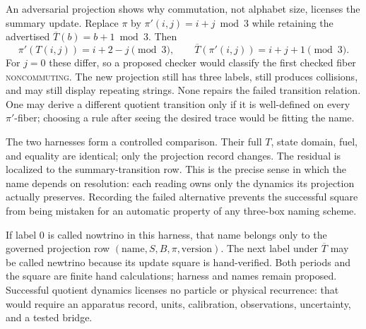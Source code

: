 An adversarial projection shows why commutation, not alphabet size, licenses the summary update.  Replace \(\pi\) by
\(\pi'(i,j)=i+j\bmod3\) while retaining the advertised \(\overline T(b)=b+1\bmod3\).  Then
\[
 \pi'(T(i,j))=i+2-j\pmod3,\qquad
 \overline T(\pi'(i,j))=i+j+1\pmod3.
\]
For \(j=0\) these differ, so a proposed checker would classify the first checked fiber
\textsc{noncommuting}.  The new projection
still has three labels, still produces collisions, and may still display repeating strings.  None repairs the failed
transition relation.  One may derive a different quotient transition only if it is well-defined on every
\(\pi'\)-fiber; choosing a rule after seeing the desired trace would be fitting the name.

The two harnesses form a controlled comparison.  Their full \(T\), state domain, fuel, and equality are identical;
only the projection record changes.  The residual is localized to the summary-transition row.  This is the precise
sense in which the name depends on resolution: each reading owns only the dynamics its projection actually preserves.
Recording the failed alternative prevents the successful square from being mistaken for an automatic property of any
three-box naming scheme.

If label \(0\) is called nowtrino in this harness, that name belongs only to the governed projection row
\((\text{name},S,B,\pi,\text{version})\).  The next label under \(\overline T\) may be called newtrino because its
update square is hand-verified.  Both periods and the square are finite hand calculations; harness and names remain
proposed.  Successful quotient dynamics licenses no particle or physical recurrence: that would require an apparatus
record, units, calibration, observations, uncertainty, and a tested bridge.
